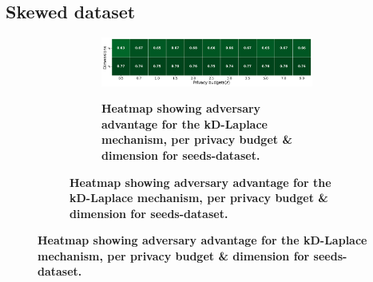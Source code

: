 \subsection{Skewed dataset}
\begin{figure}[H]
  \centering
  \begin{subfigure}[b]{0.85\textwidth}
    \begin{subfigure}[c]{1\textwidth}
      \caption{\textbf{Heatmap showing adversary advantage for the kD-Laplace mechanism, per privacy budget \& dimension for seeds-dataset.}}
      \includegraphics[width=1\textwidth]{Results/kd-laplace/kd-Laplace/skewed-dataset/shokri_mi_adv.png}
      \label{fig:privacy_skewed-dataset_adversial_advantage_kd-laplace}
    \end{subfigure}
    \vfill %


\end{subfigure}
\end{figure}
